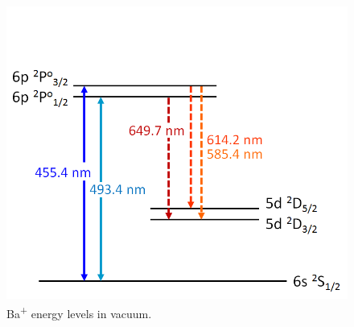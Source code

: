 \begin{figure} %
	\includegraphics[width=.6\textwidth]{figures/elevs_Ba+_separate.png}
	\caption{Ba\textsuperscript{+} energy levels in vacuum.}
    \label{fig:elevsBaPlus}
\end{figure}





